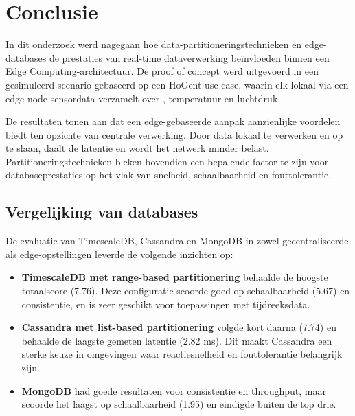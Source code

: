 
\chapter{Conclusie}%
\label{ch:conclusie}


In dit onderzoek werd nagegaan hoe data-partitioneringstechnieken en edge-databases de prestaties van real-time dataverwerking beïnvloeden binnen een Edge Computing-architectuur. De proof of concept werd uitgevoerd in een gesimuleerd scenario gebaseerd op een HoGent-use case, waarin elk lokaal via een edge-node sensordata verzamelt over , temperatuur en luchtdruk.

De resultaten tonen aan dat een edge-gebaseerde aanpak aanzienlijke voordelen biedt ten opzichte van centrale verwerking. Door data lokaal te verwerken en op te slaan, daalt de latentie en wordt het netwerk minder belast. Partitioneringstechnieken bleken bovendien een bepalende factor te zijn voor databaseprestaties op het vlak van snelheid, schaalbaarheid en fouttolerantie.

\section{Vergelijking van databases}

De evaluatie van TimescaleDB, Cassandra en MongoDB in zowel gecentraliseerde als edge-opstellingen leverde de volgende inzichten op:

\begin{itemize}
    \item \textbf{TimescaleDB met range-based partitionering} behaalde de hoogste totaalscore (7.76). Deze configuratie scoorde goed op schaalbaarheid (5.67) en consistentie, en is zeer geschikt voor toepassingen met tijdreeksdata.
    \item \textbf{Cassandra met list-based partitionering} volgde kort daarna (7.74) en behaalde de laagste gemeten latentie (2.82 ms). Dit maakt Cassandra een sterke keuze in omgevingen waar reactiesnelheid en fouttolerantie belangrijk zijn.
    \item \textbf{MongoDB} had goede resultaten voor consistentie en throughput, maar scoorde het laagst op schaalbaarheid (1.95) en eindigde buiten de top drie.
\end{itemize}

